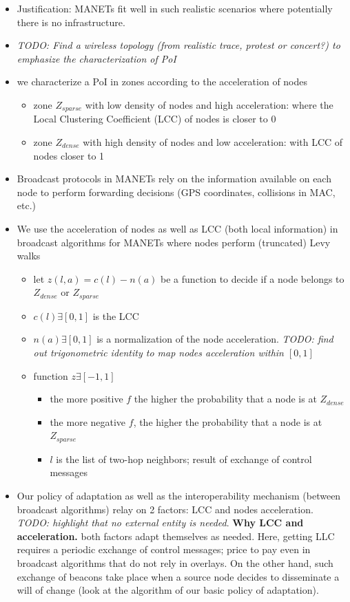 \begin{itemize}
\item Justification: MANETs fit well in such realistic scenarios where potentially there is no infrastructure.
\item \textit{TODO: Find a wireless topology (from realistic trace, protest or concert?) to emphasize the characterization of PoI}
\item we characterize a PoI in zones according to the acceleration of nodes

\begin{itemize}
	\item zone $Z_{sparse}$ with low density of nodes and high acceleration: where the Local Clustering Coefficient (LCC) of nodes is closer to 0
	\item zone $Z_{dense}$ with high density of nodes and low acceleration: with LCC of nodes closer to 1
\end{itemize}

\item Broadcast protocols in MANETs rely on the information available on each node to perform forwarding decisions (GPS coordinates, collisions in MAC, etc.)
\item We use the acceleration of nodes as well as LCC (both local information) in broadcast algorithms for MANETs where nodes perform (truncated) Levy walks
	\begin{itemize}
		\item let $z(l,a)=c(l)-n(a)$ be a function to decide if a node belongs to $Z_{dense}$ or $Z_{sparse}$
		\item $c(l) \exists [0,1]$ is the LCC
		\item $n(a) \exists [0,1]$ is a normalization of the node acceleration. \textit{TODO: find out trigonometric identity to map nodes acceleration within $[0,1]$}
		\item function $z \exists [-1, 1]$
		\begin{itemize}
		\item the more positive $f$ the higher the probability that a node is at $Z_{dense}$
		\item the more negative $f$, the higher the probability that a node is at $Z_{sparse}$
		\item $l$ is the list of two-hop neighbors; result of exchange of control messages
		\end{itemize}
	\end{itemize}

\item Our policy of adaptation as well as the interoperability mechanism (between broadcast algorithms) relay on 2 factors: LCC and nodes acceleration. \textit{TODO: highlight that no external entity is needed}. \textbf{Why LCC and acceleration.} both factors adapt themselves as needed. Here, getting LLC requires a periodic exchange of control messages; price to pay even in broadcast algorithms that do not rely in overlays. On the other hand, such exchange of beacons take place when a source node decides to disseminate a will of change (look at the algorithm of our basic policy of adaptation).

\end{itemize}

